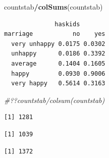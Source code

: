 \documentclass[]{book}
\newenvironment{Shaded}{\begin{snugshade}}{\end{snugshade}}
\newcommand{\CommentTok}[1]{\textcolor[rgb]{0.56,0.35,0.01}{\textit{#1}}}
\newcommand{\KeywordTok}[1]{\textcolor[rgb]{0.13,0.29,0.53}{\textbf{#1}}}
\newcommand{\NormalTok}[1]{#1}
\newcommand{\OperatorTok}[1]{\textcolor[rgb]{0.81,0.36,0.00}{\textbf{#1}}}
\newcommand{\StringTok}[1]{\textcolor[rgb]{0.31,0.60,0.02}{#1}}
\theoremstyle{definition}
\theoremstyle{definition}
\theoremstyle{definition}
\theoremstyle{remark}
\begin{document}
\begin{Shaded}
\begin{Highlighting}[]
\NormalTok{ countstab}\OperatorTok{/}\KeywordTok{colSums}\NormalTok{(countstab)}
\end{Highlighting}
\end{Shaded}

\begin{verbatim}
              haskids
marriage           no    yes
  very unhappy 0.0175 0.0302
  unhappy      0.0186 0.3392
  average      0.1404 0.1605
  happy        0.0930 0.9006
  very happy   0.5614 0.3163
\end{verbatim}

\begin{Shaded}
\begin{Highlighting}[]
\CommentTok{#??countstab/colsum(countstab)}
\end{Highlighting}
\end{Shaded}

\begin{Shaded}
\end{Shaded}

\begin{verbatim}
[1] 1281
\end{verbatim}

\begin{Shaded}
\end{Shaded}

\begin{verbatim}
[1] 1039
\end{verbatim}

\begin{Shaded}
\end{Shaded}

\begin{verbatim}
[1] 1372
\end{verbatim}
\end{document}
